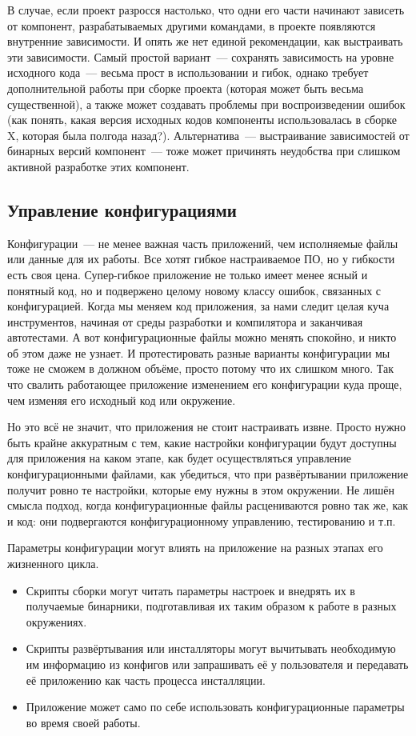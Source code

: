 \documentclass{../../text-style}
\begin{document}
В случае, если проект разросся настолько, что одни его части начинают зависеть от компонент, разрабатываемых другими командами, в проекте появляются внутренние зависимости. И опять же нет единой рекомендации, как выстраивать эти зависимости. Самый простой вариант~--- сохранять зависимость на уровне исходного кода~--- весьма прост в использовании и гибок, однако требует дополнительной работы при сборке проекта (которая может быть весьма существенной), а также может создавать проблемы при воспроизведении ошибок (как понять, какая версия исходных кодов компоненты использовалась в сборке X, которая была полгода назад?). Альтернатива~--- выстраивание зависимостей от бинарных версий компонент~--- тоже может причинять неудобства при слишком активной разработке этих компонент.

\subsection{Управление конфигурациями}

Конфигурации~--- не менее важная часть приложений, чем исполняемые файлы или данные для их работы. Все хотят гибкое настраиваемое ПО, но у гибкости есть своя цена. Супер-гибкое приложение не только имеет менее ясный и понятный код, но и подвержено целому новому классу ошибок, связанных с конфигурацией. Когда мы меняем код приложения, за нами следит целая куча инструментов, начиная от среды разработки и компилятора и заканчивая автотестами. А вот конфигурационные файлы можно менять спокойно, и никто об этом даже не узнает. И протестировать разные варианты конфигурации мы тоже не сможем в должном объёме, просто потому что их слишком много. Так что свалить работающее приложение изменением его конфигурации куда проще, чем изменяя его исходный код или окружение.

Но это всё не значит, что приложения не стоит настраивать извне. Просто нужно быть крайне аккуратным с тем, какие настройки конфигурации будут доступны для приложения на каком этапе, как будет осуществляться управление конфигурационными файлами, как убедиться, что при развёртывании приложение получит ровно те настройки, которые ему нужны в этом окружении. Не лишён смысла подход, когда конфигурационные файлы расцениваются ровно так же, как и код: они подвергаются конфигурационному управлению, тестированию и т.п.

Параметры конфигурации могут влиять на приложение на разных этапах его жизненного цикла.

\begin{itemize}
    \item Скрипты сборки могут читать параметры настроек и внедрять их в получаемые бинарники, подготавливая их таким образом к работе в разных окружениях.
    \item Скрипты развёртывания или инсталляторы могут вычитывать необходимую им информацию из конфигов или запрашивать её у пользователя и передавать её приложению как часть процесса инсталляции.
    \item Приложение может само по себе использовать конфигурационные параметры во время своей работы.
\end{itemize}
\end{document}
